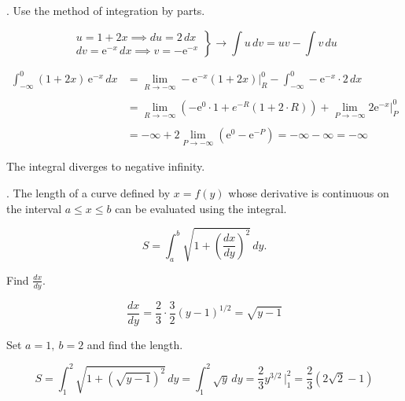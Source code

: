 \documentclass{article}
\begin{document}
\hfill

. Use the method of integration by parts.

\[
\left.\begin{array}{c}
u=1+2x\implies du=2\,dx\\
dv=\mathrm{e}^{-x}\,dx\implies v=-\mathrm{e}^{-x}
\end{array}\right\}\rightarrow\int u\,dv=uv-\int v\,du
\]

\begin{align*}\int_{-\infty}^0(1+2x)\,\mathrm{e}^{-x}\,dx&=\lim_{R\to-\infty}-\mathrm{e}^{-x}(1+2x)\bigg|_R^0-\int_{-\infty}^0-\mathrm{e}^{-x}\cdot2\,dx\\\\&=\lim_{R\to-\infty}\left(-\mathrm{e}^0\cdot1+\mathrm{}e^{-R}(1+2\cdot R)\right)+\lim_{P\to-\infty}2\mathrm{e}^{-x}\bigg|_P^0\\\\&=-\infty+2\lim_{P\to-\infty}\left(\mathrm{e}^0-\mathrm{e}^{-P}\right)=-\infty-\infty=\boxed{-\infty}\end{align*}

\hfill

\noindent The integral diverges to negative infinity.

\hfill

. The length of a curve defined by $x=f(y)$ whose derivative is continuous on the interval $a\leq x\leq b$ can be evaluated using the integral.

\[S=\int_a^b\sqrt{1+\left(\frac{dx}{dy}\right)^2}\,dy.\]

\hfill

\noindent Find $\displaystyle\frac{dx}{dy}$.

\[\frac{dx}{dy}=\frac23\cdot\frac32(y-1)^{1/2}=\sqrt{y-1}\]

\hfill

\noindent Set $a=1,\:b=2$ and find the length.

\[S=\int_1^2\sqrt{1+\left(\sqrt{y-1}\right)^2}\,dy=\int_1^2\sqrt{y}\,dy=\frac23y^{3/2}\,\bigg|_1^2=\boxed{\frac23(2\sqrt2-1)}\]
\end{document}
